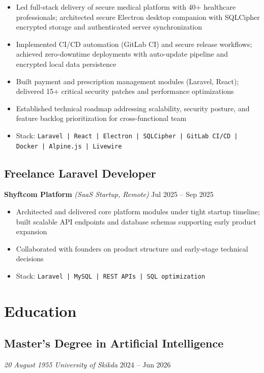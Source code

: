 \documentclass[11pt,a4paper]{article}
\newcommand{\role}[1]{\textbf{#1}}
\newcommand{\company}[1]{\textit{#1}}
\newcommand{\dates}[1]{\hfill{\color{gray}\small #1}}
\newcommand{\tech}[1]{{\color{darkblue}\small\texttt{#1}}}
\begin{document}
\begin{itemize}
    \item Led full-stack delivery of secure medical platform with 40+ healthcare professionals; architected secure Electron desktop companion with SQLCipher encrypted storage and authenticated server synchronization
    \item Implemented CI/CD automation (GitLab CI) and secure release workflows; achieved zero-downtime deployments with auto-update pipeline and encrypted local data persistence
    \item Built payment and prescription management modules (Laravel, React); delivered 15+ critical security patches and performance optimizations
    \item Established technical roadmap addressing scalability, security posture, and feature backlog prioritization for cross-functional team
    \item Stack: \tech{Laravel | React | Electron | SQLCipher | GitLab CI/CD | Docker | Alpine.js | Livewire}
\end{itemize}

\vspace{4pt}

\subsection{Freelance Laravel Developer}
\role{Shyftcom Platform} \company{(SaaS Startup, Remote)} \dates{Jul 2025 – Sep 2025}

\begin{itemize}
    \item Architected and delivered core platform modules under tight startup timeline; built scalable API endpoints and database schemas supporting early product expansion
    \item Collaborated with founders on product structure and early-stage technical decisions
    \item Stack: \tech{Laravel | MySQL | REST APIs | SQL optimization}
\end{itemize}

\vspace{6pt}

\section{Education}

\subsection{Master's Degree in Artificial Intelligence}
\company{20 August 1955 University of Skikda} \dates{2024 – Jun 2026}
\end{document}
